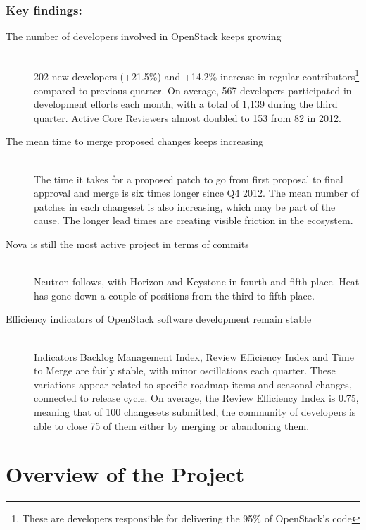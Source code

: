 \documentclass[a4wide,11pt]{report}
\begin{document}
\subsection*{Key findings:}
\begin{description}

\item[The number of developers involved in OpenStack keeps growing] \hfill \\ 
202 new developers (+21.5\%) and +14.2\% increase in regular contributors\footnote{These are developers responsible for delivering the 95\% of OpenStack's code} compared to previous quarter. On average, 567 developers participated in development efforts each month, with a total of 1,139 during the third quarter. Active Core Reviewers almost doubled to 153 from 82 in 2012.

\item[The mean time to merge proposed changes keeps increasing] \hfill \\ 
The time it takes for a proposed patch to go from first proposal to final approval and merge is six times longer since Q4 2012. The mean number of patches in each changeset is also increasing, which may be part of the cause. The longer lead times are creating visible friction in the ecosystem. 

\item[Nova is still the most active project in terms of commits] \hfill \\  
Neutron follows, with Horizon and Keystone in fourth and fifth place. Heat has gone down a couple of positions from the third to fifth place.

\item[Efficiency indicators of OpenStack software development remain stable] \hfill \\  
Indicators Backlog Management Index, Review Efficiency Index and Time to Merge are fairly stable, with minor oscillations each quarter. These variations appear related to specific roadmap items and seasonal changes, connected to release cycle. On average, the Review Efficiency Index is 0.75, meaning that of 100 changesets submitted, the community of developers is able to close 75 of them either by merging or abandoning them.

\end{description}


\setcounter{tocdepth}{4}
\setcounter{secnumdepth}{4}
\tableofcontents


\chapter{Overview of the Project}
\end{document}
